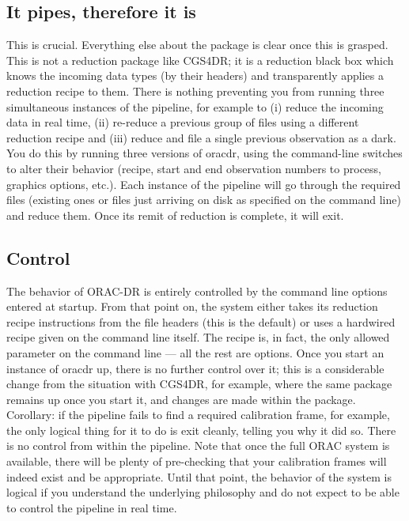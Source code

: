 \documentclass[twoside,11pt]{article}
\renewcommand{\_}{\texttt{\symbol{95}}}
\begin{document}
\subsection*{It pipes, therefore it is}%

This is crucial. Everything else about the package is clear once this
is grasped. This is not a reduction package like CGS4DR; it is a
reduction black box which knows the incoming data types (by their
headers) and transparently applies a reduction recipe to them. There
is nothing preventing you from running three simultaneous instances of
the pipeline, for example to (i) reduce the incoming data in real
time, (ii) re-reduce a previous group of files using a different
reduction recipe and (iii) reduce and file a single previous
observation as a dark. You do this by running three versions of
oracdr, using the command-line switches to alter their behavior
(recipe, start and end observation numbers to process, graphics
options, etc.). Each instance of the pipeline will go through the
required files (existing ones or files just arriving on disk as
specified on the command line) and reduce them. Once its remit of
reduction is complete, it will exit.

\subsection*{Control}%

The behavior of ORAC-DR is entirely controlled by the command line
options entered at startup. From that point on, the system either
takes its reduction recipe instructions from the file headers (this is
the default) or uses a hardwired recipe given on the command line
itself. The recipe is, in fact, the only allowed parameter on the
command line --- all the rest are options. Once you start an instance of
oracdr up, there is no further control over it; this is a considerable
change from the situation with CGS4DR, for example, where the same
package remains up once you start it, and changes are made within the
package. Corollary: if the pipeline fails to find a required
calibration frame, for example, the only logical thing for it to do is
exit cleanly, telling you why it did so. There is no control from
within the pipeline. Note that once the full ORAC system is available,
there will be plenty of pre-checking that your calibration frames will
indeed exist and be appropriate. Until that point, the behavior of
the system is logical if you understand the underlying philosophy and
do not expect to be able to control the pipeline in real time.
\end{document}
